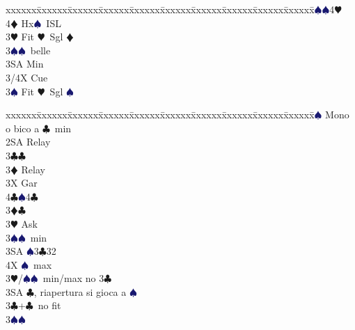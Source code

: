 \documentclass[a4paper,italian]{article}
\newcommand{\BC}{\textcolor{OliveGreen}{$\clubsuit$}}
\newcommand{\BD}{\textcolor{RedOrange}{$\vardiamondsuit$}}
\newcommand{\BH}{\textcolor{Red2}{$\varheartsuit${}}}
\newcommand{\BS}{\textcolor{MidnightBlue}{$\spadesuit${}}}
\newenvironment{bidtable}
{\begin{tabbing}

    xxxxxx\=xxxxxx\=xxxxxx\=xxxxxx\=xxxxxx\=xxxxxx\=xxxxxx\=xxxxxx\=xxxxxx\=xxxxxx\=\kill}
{\end{tabbing} }%
\begin{document}
\begin{multicols}{2}
\begin{bidtable}
                                            3\BS {}\BS4\BH\+\\
                                            4\BD \> Hx\BS\ ISL\-\-\\
                                            3\BH \> Fit \BH\ Sgl \BD \+\\
                                            3\BS {}\BS\ belle\\
                                            3SA \> Min\\
                                            3/4X \> Cue\-\\
                                            3\BS \> Fit \BH\ Sgl \BS \-\\
                                        \end{bidtable}
                                        \columnbreak
                                        \begin{bidtable}
                                            2\BS \> Mono o bico a \BC\ min\+\\
                                            2SA \> Relay\+\\
                                            3\BC {}\BC \+\\
                                            3\BD \> Relay\+\\
                                            3X \> Gar\\
                                            4\BC {}\BS 4\BC \-\-\\
                                            3\BD {}\BC \+\\
                                            3\BH \> Ask\+\\
                                            3\BS {}\BS\ min\\
                                            3SA \BS 3\BC 32\\
                                            4X \BS\ max\-\-\\
                                            3\BH/\BS {}\BS\ min/max no 3\BC \\
                                            3SA \BC , riapertura si gioca a \BS \-\\
                                            3\BC {}+\BC\ no fit\+\\
                                            3\BS {}\BS \+\\

\end{bidtable}
\end{multicols}
\end{document}
